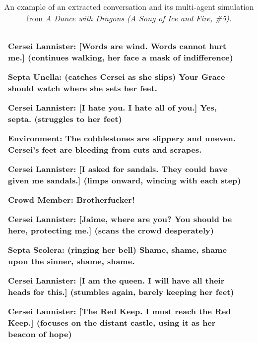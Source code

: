 \begin{table*}[h]
{\begin{tabular}{p{1in}|p{5.4in}}
    \quad 
            
            
    Cersei Lannister: [Words are wind. Words cannot hurt me.] (continues walking, her face a mask of indifference)
    
    \quad 
    
    Septa Unella: (catches Cersei as she slips) Your Grace should watch where she sets her feet.
    
    \quad 
    
    Cersei Lannister: [I hate you. I hate all of you.] Yes, septa. (struggles to her feet)
    
    \quad 
    
    Environment: The cobblestones are slippery and uneven. Cersei's feet are bleeding from cuts and scrapes.
    
    \quad 
    
    Cersei Lannister: [I asked for sandals. They could have given me sandals.] (limps onward, wincing with each step)
    
    \quad 
    
    Crowd Member: Brotherfucker!
    
    \quad 
    
    Cersei Lannister: [Jaime, where are you? You should be here, protecting me.] (scans the crowd desperately)
    
    \quad 
    
    Septa Scolera: (ringing her bell) Shame, shame, shame upon the sinner, shame, shame.
    
    \quad 
    
    Cersei Lannister: [I am the queen. I will have all their heads for this.] (stumbles again, barely keeping her feet)
    
    \quad 
    
    Cersei Lannister: [The Red Keep. I must reach the Red Keep.] (focuses on the distant castle, using it as her beacon of hope)

\\ 
    
\bottomrule

\end{tabular}}

\caption{An example of an extracted conversation and its multi-agent simulation from \textit{A Dance with Dragons (A Song of Ice and Fire, \#5)}. }
\label{tab:case_cerci}
\end{table*}

